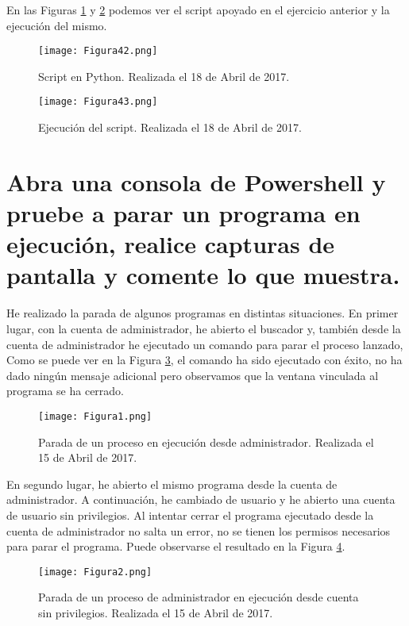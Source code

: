 En las Figuras \ref{fig:figura42} y \ref{fig:figura43} podemos ver el script apoyado en el ejercicio anterior y la ejecución del mismo. 
\begin{figure}[H] 
\centering
\texttt{[image: Figura42.png]}  
\caption{Script en Python. Realizada el 18 de Abril de 2017.} \label{fig:figura42}
\end{figure}
\begin{figure}[H] 
\centering
\texttt{[image: Figura43.png]}  
\caption{Ejecución del script. Realizada el 18 de Abril de 2017.} \label{fig:figura43}
\end{figure}




\section{Abra una consola de Powershell y pruebe a parar un programa en ejecución, realice capturas de pantalla y comente lo que muestra.}

He realizado la parada de algunos programas en distintas situaciones. En primer lugar, con la cuenta de administrador, he abierto el buscador y, también desde la 
cuenta de administrador he ejecutado un comando para parar el proceso lanzado, Como se puede ver en la Figura \ref{fig:figura1}, el comando ha sido ejecutado con 
éxito, no ha dado ningún mensaje adicional pero observamos que la ventana vinculada al programa se ha cerrado. 

\begin{figure}[H] 
\centering
\texttt{[image: Figura1.png]}  
\caption{Parada de un proceso en ejecución desde administrador. Realizada el 15 de Abril de 2017.} \label{fig:figura1}
\end{figure}

En segundo lugar, he abierto el mismo programa desde la cuenta de administrador. A continuación, he cambiado de usuario y he abierto una cuenta de usuario sin
privilegios. Al intentar cerrar el programa ejecutado desde la cuenta de administrador no salta un error, no se tienen los permisos necesarios para parar el programa.
Puede observarse el resultado en la Figura \ref{fig:figura2}.

\begin{figure}[H] 
\centering
\texttt{[image: Figura2.png]}  
\caption{Parada de un proceso de administrador en ejecución desde cuenta sin privilegios. Realizada el 15 de Abril de 2017.} \label{fig:figura2}
\end{figure}

